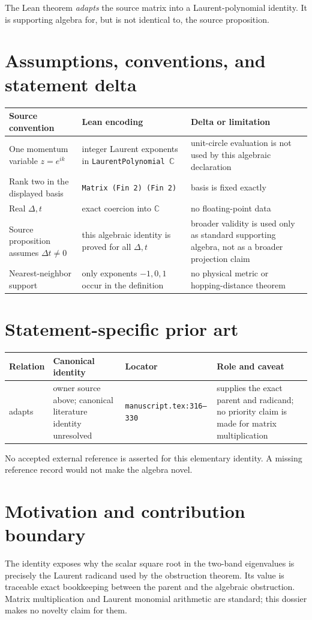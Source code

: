 \documentclass[11pt]{article}
\begin{document}
The Lean theorem \emph{adapts} the source matrix into a Laurent-polynomial identity. It
is supporting algebra for, but is not identical to, the source proposition.

\section{Assumptions, conventions, and statement delta}
\begin{tabularx}{\textwidth}{@{}XXX@{}}\toprule
Source convention & Lean encoding & Delta or limitation \\
\midrule
One momentum variable $z=e^{ik}$ & integer Laurent exponents in
\texttt{LaurentPolynomial $\mathbb C$} & unit-circle evaluation is not used by this algebraic declaration \\
Rank two in the displayed basis & \texttt{Matrix (Fin 2) (Fin 2)} & basis is fixed exactly \\
Real $\Delta,t$ & exact coercion into $\mathbb C$ & no floating-point data \\
Source proposition assumes $\Delta t\ne0$ & this algebraic identity is proved for all
$\Delta,t$ & broader validity is used only as standard supporting algebra, not as a
broader projection claim \\
Nearest-neighbor support & only exponents $-1,0,1$ occur in the definition & no physical
metric or hopping-distance theorem \\
\bottomrule\end{tabularx}

\section{Statement-specific prior art}
\begin{tabularx}{\textwidth}{@{}lXXX@{}}\toprule
Relation & Canonical identity & Locator & Role and caveat \\
\midrule
adapts & owner source above; canonical literature identity unresolved &
\texttt{manuscript.tex:316--330} & supplies the exact parent and radicand; no priority
claim is made for matrix multiplication \\
\bottomrule\end{tabularx}

No accepted external reference is asserted for this elementary identity. A missing
reference record would not make the algebra novel.

\section{Motivation and contribution boundary}
The identity exposes why the scalar square root in the two-band eigenvalues is precisely
the Laurent radicand used by the obstruction theorem. Its value is traceable exact
bookkeeping between the parent and the algebraic obstruction. Matrix multiplication and
Laurent monomial arithmetic are standard; this dossier makes no novelty claim for them.
\end{document}
